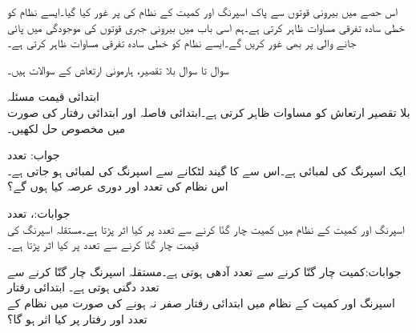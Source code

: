 
اس حصے میں بیرونی قوتوں سے پاک  اسپرنگ اور کمیت کے نظام کی  پر غور کیا گیا۔ایسے نظام کو  خطی سادہ تفرقی مساوات ظاہر کرتی ہے۔ہم اسی باب میں بیرونی جبری قوتوں کی موجودگی میں پائی جانے والی  پر بھی غور کریں گے۔ایسے نظام کو  خطی سادہ تفرقی مساوات ظاہر کرتی ہے۔


سوال  تا سوال  بلا تقصیر، ہارمونی ارتعاش کے سوالات ہیں۔

 \quad ابتدائی قیمت مسئلہ\\
بلا تقصیر ارتعاش کو مساوات  ظاہر کرتی ہے۔ابتدائی فاصلہ  اور ابتدائی رفتار  کی صورت میں مخصوص حل لکھیں۔

جواب: 
\quad تعدد\\
ایک اسپرنگ کی لمبائی  ہے۔اس سے  کا گیند لٹکانے سے اسپرنگ کی لمبائی  ہو جاتی ہے۔اس نظام کی تعدد  اور دوری عرصہ  کیا ہوں گے؟ 

جوابات:، 
\quad تعدد\\
اسپرنگ اور کمیت کے نظام میں کمیت چار گنّا کرنے سے تعدد پر کیا اثر پڑتا ہے۔مستقلہ اسپرنگ کی قیمت چار گنّا کرنے سے تعدد پر کیا اثر پڑتا ہے۔

 جوابات:کمیت چار گنّا کرنے سے تعدد آدھی ہوتی ہے۔مستقلہ اسپرنگ چار گنّا کرنے سے تعدد دگنی ہوتی ہے۔ 
\quad ابتدائی رفتار\\
اسپرنگ اور کمیت کے نظام میں ابتدائی رفتار صفر نہ ہونے کی صورت میں نظام کے تعدد اور رفتار پر کیا اثر ہو گا؟

